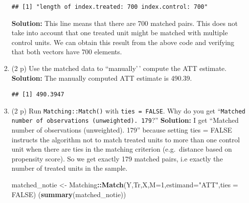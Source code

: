 \documentclass[
]{article}
\newenvironment{Shaded}{\begin{snugshade}}{\end{snugshade}}
\newcommand{\AttributeTok}[1]{\textcolor[rgb]{0.13,0.29,0.53}{#1}}
\newcommand{\ConstantTok}[1]{\textcolor[rgb]{0.56,0.35,0.01}{#1}}
\newcommand{\DecValTok}[1]{\textcolor[rgb]{0.00,0.00,0.81}{#1}}
\newcommand{\FunctionTok}[1]{\textcolor[rgb]{0.13,0.29,0.53}{\textbf{#1}}}
\newcommand{\NormalTok}[1]{#1}
\newcommand{\OtherTok}[1]{\textcolor[rgb]{0.56,0.35,0.01}{#1}}
\newcommand{\SpecialCharTok}[1]{\textcolor[rgb]{0.81,0.36,0.00}{\textbf{#1}}}
\newcommand{\StringTok}[1]{\textcolor[rgb]{0.31,0.60,0.02}{#1}}
\begin{document}
\begin{enumerate}
\begin{verbatim}
## [1] "length of index.treated: 700 index.control: 700"
\end{verbatim}

  \textbf{Solution:} This line means that there are 700 matched pairs.
  This does not take into account that one treated unit might be matched
  with multiple control units. We can obtain this result from the above
  code and verifying that both vectors have 700 elements.
\item
  (2 p) Use the matched data to ``manually'\,' compute the ATT estimate.
  \newline \textbf{Solution:} The manually computed ATT estimate is
  490.39.

\begin{Shaded}
\end{Shaded}

\begin{verbatim}
## [1] 490.3947
\end{verbatim}
\item
  (2 p) Run \texttt{Matching::Match()} with \texttt{ties = FALSE}. Why
  do you get
  ``\texttt{Matched number of observations (unweighted). 179}?''
  \newline \textbf{Solution:} I get ``Matched number of observations
  (unweighted). 179'' because setting ties = FALSE instructs the
  algorithm not to match treated units to more than one control unit
  when there are ties in the matching criterion (e.g.~distance based on
  propensity score). So we get exactly 179 matched pairs, i.e exactly
  the number of treated units in the sample.

\begin{Shaded}
\begin{Highlighting}[]
\NormalTok{matched\_notie }\OtherTok{\textless{}{-}}\NormalTok{ Matching}\SpecialCharTok{::}\FunctionTok{Match}\NormalTok{(Y,Tr,X,}\AttributeTok{M=}\DecValTok{1}\NormalTok{,}\AttributeTok{estimand=}\StringTok{"ATT"}\NormalTok{,}\AttributeTok{ties =} \ConstantTok{FALSE}\NormalTok{)}
\NormalTok{(}\FunctionTok{summary}\NormalTok{(matched\_notie))}
\end{Highlighting}
\end{Shaded}


\end{enumerate}
\end{document}
